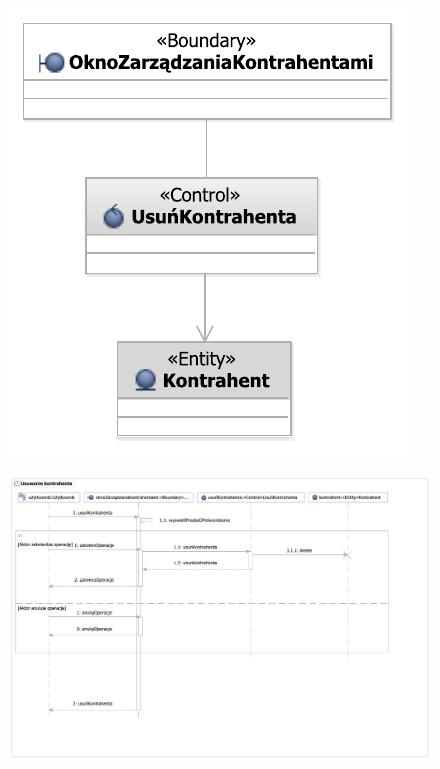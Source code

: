 \begin{figure}[H]
  \centering
  \includegraphics[angle=\ecbangle, scale=\ecbscale]{../img/usecase/pu11ecb.pdf}
  \caption{}
\end{figure}
\begin{figure}[H]
  \centering
  \includegraphics[angle=\seqangle, scale=0.55]{../img/usecase/pu11seq.pdf}
  \caption{}
\end{figure}
\newpage

